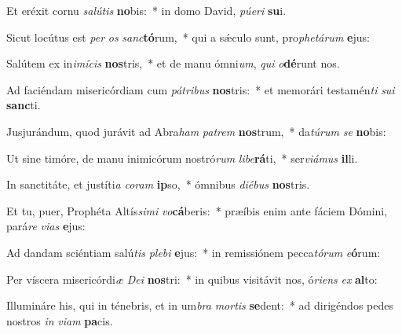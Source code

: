 \item Et eréxit cornu \textit{sa}\textit{lú}\textit{tis} \textbf{no}bis:~* in domo David, \textit{pú}\textit{e}\textit{ri} \textbf{su}i.
\item Sicut locútus est \textit{per} \textit{os} \textit{sanc}\textbf{tó}rum,~* qui a sǽculo sunt, pro\textit{phe}\textit{tá}\textit{rum} \textbf{e}jus:
\item Salútem ex in\textit{i}\textit{mí}\textit{cis} \textbf{nos}tris,~* et de manu ómni\textit{um}, \textit{qui} \textit{o}\textbf{dé}runt nos.
\item Ad faciéndam misericórdiam cum \textit{pá}\textit{tri}\textit{bus} \textbf{nos}tris:~* et memorári testamén\textit{ti} \textit{su}\textit{i} \textbf{sanc}ti.
\item Jusjurándum, quod jurávit ad Abra\textit{ham} \textit{pa}\textit{trem} \textbf{nos}trum,~* da\textit{tú}\textit{rum} \textit{se} \textbf{no}bis:
\item Ut sine timóre, de manu inimicórum nostró\textit{rum} \textit{li}\textit{be}\textbf{rá}ti,~* ser\textit{vi}\textit{á}\textit{mus} \textbf{il}li.
\item In sanctitáte, et justíti\textit{a} \textit{co}\textit{ram} \textbf{ip}so,~* ómnibus \textit{di}\textit{é}\textit{bus} \textbf{nos}tris.
\item Et tu, puer, Prophéta Altís\textit{si}\textit{mi} \textit{vo}\textbf{cá}beris:~* præíbis enim ante fáciem Dómini, pará\textit{re} \textit{vi}\textit{as} \textbf{e}jus:
\item Ad dandam sciéntiam salú\textit{tis} \textit{ple}\textit{bi} \textbf{e}jus:~* in remissiónem pecca\textit{tó}\textit{rum} \textit{e}\textbf{ó}rum:
\item Per víscera misericórdi\textit{æ} \textit{De}\textit{i} \textbf{nos}tri:~* in quibus visitávit nos, ó\textit{ri}\textit{ens} \textit{ex} \textbf{al}to:
\item Illumináre his, qui in ténebris, et in um\textit{bra} \textit{mor}\textit{tis} \textbf{se}dent:~* ad dirigéndos pedes nostros \textit{in} \textit{vi}\textit{am} \textbf{pa}cis.
